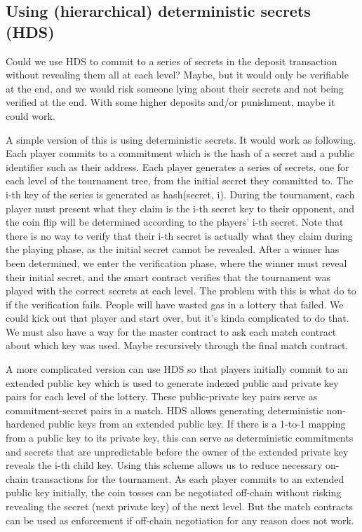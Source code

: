 \subsection{Using (hierarchical) deterministic secrets (HDS)}
Could we use HDS to commit to a series of secrets in the deposit transaction without revealing them all at each level? Maybe, but it would only be verifiable at the end, and we would risk someone lying about their secrets and not being verified at the end. With some higher deposits and/or punishment, maybe it could work.

A simple version of this is using deterministic secrets. It would work as following. Each player commits to a commitment which is the hash of a secret and a public identifier such as their address. Each player generates a series of secrets, one for each level of the tournament tree, from the initial secret they committed to. The i-th key of the series is generated as hash(secret, i). During the tournament, each player must present what they claim is the i-th secret key to their opponent, and the coin flip will be determined according to the players' i-th secret. Note that there is no way to verify that their i-th secret is actually what they claim during the playing phase, as the initial secret cannot be revealed. After a winner has been determined, we enter the verification phase, where the winner must reveal their initial secret, and the smart contract verifies that the tournament was played with the correct secrets at each level. 
The problem with this is what do to if the verification fails. People will have wasted gas in a lottery that failed. We could kick out that player and start over, but it's kinda complicated to do that. We must also have a way for the master contract to ask each match contract about which key was used. Maybe recursively through the final match contract.

A more complicated version can use HDS so that players initially commit to an extended public key which is used to generate indexed public and private key pairs for each level of the lottery. These public-private key pairs serve as commitment-secret pairs in a match. HDS allows generating deterministic non-hardened public keys from an extended public key. If there is a 1-to-1 mapping from a public key to its private key, this can serve as deterministic commitments and secrets that are unpredictable before the owner of the extended private key reveals the i-th child key. Using this scheme allows us to reduce necessary on-chain transactions for the tournament. As each player commits to an extended public key initially, the coin tosses can be negotiated off-chain without risking revealing the secret (next private key) of the next level. But the match contracts can be used as enforcement if off-chain negotiation for any reason does not work. 

